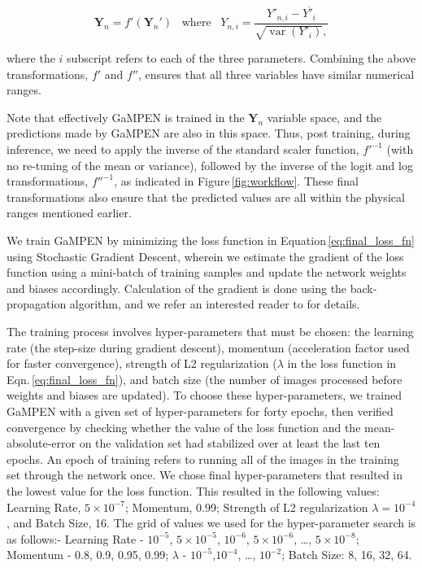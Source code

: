 \documentclass[twocolumn]{aastex63}
\newcommand\gampen{GaMPEN}
\begin{document}
\begin{CJK*}{UTF8}{gbsn}
\begin{equation}
\boldsymbol{Y}_n = f'(\boldsymbol{Y}_n')\,\,\,\,\,\mathrm{where}\,\,\,\,\,{Y}_{n,i} = \frac{Y'_{n,i} - \overline{Y'_{i}}}{\sqrt{\operatorname{var}(Y'_{i})} ,} 
\label{eq:transformation_f'}
\end{equation}

\noindent
where the $i$ subscript refers to each of the three parameters. Combining the above transformations, $f'$ and $f''$, ensures that all three variables have similar numerical ranges.  

Note that effectively \gampen{} is trained in the $\boldsymbol{Y}_n$ variable space, and the predictions made by \gampen{} are also in this space. Thus, post training, during inference, we need to apply the inverse of the standard scaler function, $f'^{-1}$ (with no re-tuning of the mean or variance), followed by the inverse of the logit and log transformations, $f''^{-1}$, as indicated in Figure\,\ref{fig:workflow}. These final transformations also ensure that the predicted values are all within the physical ranges mentioned earlier.

We train \gampen{} by minimizing the loss function in Equation\,\ref{eq:final_loss_fn} using Stochastic Gradient Descent, wherein we estimate the gradient of the loss function using a mini-batch of training samples and update the network weights and biases accordingly. Calculation of the gradient is done using the back-propagation algorithm, and we refer an interested reader to \citet{rumelhart_88} for details.

The training process involves hyper-parameters that must be chosen: the learning rate (the step-size during gradient descent), momentum (acceleration factor used for faster convergence), strength of L2 regularization ($\lambda$ in the loss function in Eqn.\,\ref{eq:final_loss_fn}), and batch size (the number of images processed before weights and biases are updated).
To choose these hyper-parameters, we trained \gampen{} with a given set of hyper-parameters for forty epochs, then verified convergence by checking whether the value of the loss function and the mean-absolute-error on the validation set had stabilized over at least the last ten epochs. An epoch of training refers to running all of the images in the training set through the network once. We chose final hyper-parameters that resulted in the lowest value for the loss function. This resulted in the following values: Learning Rate, $5\times10^{-7}$; Momentum, 0.99; Strength of L2 regularization $\lambda=10^{-4}$, and Batch Size, 16. The grid of values we used for the hyper-parameter search is as follows:- Learning Rate - $10^{-5}$, $5 \times 10^{-5}$, $10^{-6}$, $5 \times 10^{-6}$, \ldots,  $5 \times 10^{-8}$; Momentum - 0.8, 0.9, 0.95, 0.99; $\lambda$ - $10^{-5}$,$10^{-4}$, \ldots, $10^{-2}$; Batch Size: 8, 16, 32, 64.


\end{CJK*}
\end{document}
